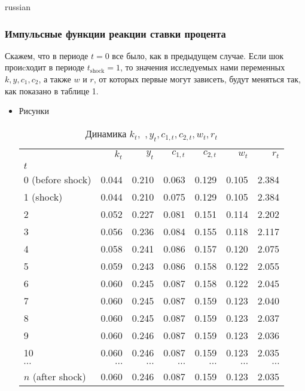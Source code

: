 \documentclass[fleqn]{article}
\begin{document}
\begin{otherlanguage*}{russian}
\subsubsection*{Импульсные функции реакции ставки процента}
Скажем, что в периоде $ t = 0 $ все было, как в предыдущем случае. Если шок проиcходит в периоде $ t_{\text{shock}} = 1 $, то значения исследуемых нами переменных $ k, y, c_1, c_2 $, а также $ w $ и $r$, от которых первые могут зависеть, будут меняться так, как показано в таблице 1. 
\begin{itemize}
\item Рисунки
\begin{table*}
\centering
\caption{Динамика $k_t, \,\,, y_t, c_{1, t}, c_{2, t}, w_t, r_t $ }
\begin{tabular}{|l|r|r|r|r|r|r|}
\toprule
{} &  $k_t$  &     $y_t$ &    $c_{1, t}$ &   $c_{2, t}$ &      $w_t$ &      $r_t$ \\
$t$ &        &        &        &        &        &        \\
\midrule
0  (before shock) &  0.044 &  0.210 &  0.063 &  0.129 &  0.105 &  2.384 \\
1  (shock) &  0.044 &  0.210 &  0.075 &  0.129 &  0.105 &  2.384 \\
2  &  0.052 &  0.227 &  0.081 &  0.151 &  0.114 &  2.202 \\
3  &  0.056 &  0.236 &  0.084 &  0.155 &  0.118 &  2.117 \\
4  &  0.058 &  0.241 &  0.086 &  0.157 &  0.120 &  2.075 \\
5  &  0.059 &  0.243 &  0.086 &  0.158 &  0.122 &  2.055 \\
6  &  0.060 &  0.245 &  0.087 &  0.158 &  0.122 &  2.045 \\
7  &  0.060 &  0.245 &  0.087 &  0.159 &  0.123 &  2.040 \\
8  &  0.060 &  0.245 &  0.087 &  0.159 &  0.123 &  2.037 \\
9  &  0.060 &  0.246 &  0.087 &  0.159 &  0.123 &  2.036 \\
10 &  0.060 &  0.246 &  0.087 &  0.159 &  0.123 &  2.035 \\
$\cdots$ &  $\cdots$ &  $\cdots$ &  $\cdots$ &  $\cdots$ &  $\cdots$ &  $\cdots$ \\
$n$ (after shock)&  0.060 &  0.246 &  0.087 &  0.159 &  0.123 &  2.035 \\
\bottomrule
\end{tabular}
\end{table*}
 


\end{itemize}
\end{otherlanguage*}
\end{document}
